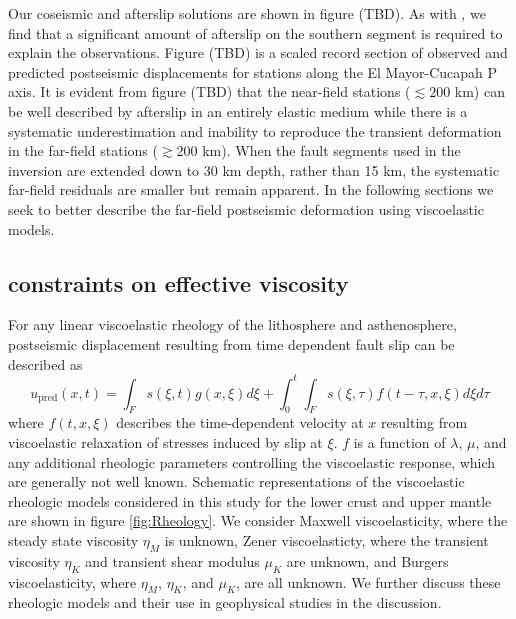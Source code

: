 \documentclass[1p]{elsarticle}
\begin{document}
Our coseismic and afterslip solutions are shown in figure (TBD).  As with \citet{Rollins2015}, we find that a significant amount of afterslip on the southern segment is required to explain the observations. Figure (TBD) is a scaled record section of observed and predicted postseismic displacements for stations along the El Mayor-Cucapah P axis.  It is evident from figure (TBD) that the near-field stations ($\lesssim200$ km) can be well described by afterslip in an entirely elastic medium while there is a systematic underestimation and inability to reproduce the transient deformation in the far-field stations ($\gtrsim200$ km).  When the fault segments used in the inversion are extended down to 30 km depth, rather than 15 km, the systematic far-field residuals are smaller but remain apparent.  In the following sections we seek to better describe the far-field postseismic deformation using viscoelastic models.  

\subsection{constraints on effective viscosity}\label{sec:InitialInversion}


For any linear viscoelastic rheology of the lithosphere and asthenosphere, postseismic displacement resulting from time dependent fault slip can be described as  
\begin{equation}\label{GeneralForward}
  u_\mathrm{pred}(x,t) = \int_F s(\xi,t)g(x,\xi)d\xi + 
           \int_0^t\int_F s(\xi,\tau) f(t-\tau,x,\xi) d\xi d\tau
\end{equation}
where $f(t,x,\xi)$ describes the time-dependent velocity at $x$ resulting from viscoelastic relaxation of stresses induced by slip at $\xi$. $f$ is a function of $\lambda$, $\mu$, and any additional rheologic parameters controlling the viscoelastic response, which are generally not well known. Schematic representations of the viscoelastic rheologic models considered in this study for the lower crust and upper mantle are shown in figure \ref{fig:Rheology}.  We consider Maxwell viscoelasticity, where the steady state viscosity $\eta_M$ is unknown, Zener viscoelasticty, where the transient viscosity $\eta_K$ and transient shear modulus $\mu_K$ are unknown, and Burgers viscoelasticity, where $\eta_M$, $\eta_K$, and $\mu_K$, are all unknown. We further discuss these rheologic models and their use in geophysical studies in the discussion. 
\end{document}
